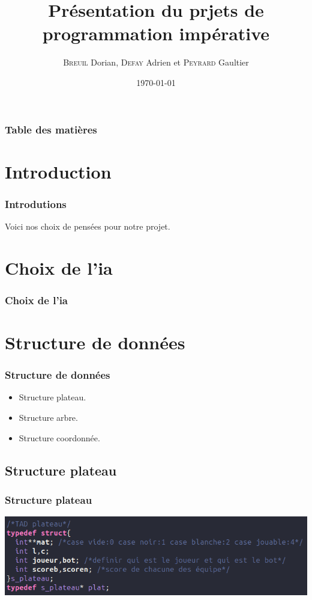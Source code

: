 \documentclass[9pt]{beamer}
\title{Présentation du prjets de programmation impérative}
\author{\textsc{Breuil} Dorian, \textsc{Defay} Adrien et \textsc{Peyrard} Gaultier}
\date{\today}
\begin{document}
\frame{\titlepage}  %

\begin{frame}
  \frametitle{Table des matières}
  \tableofcontents
  
\end{frame}

\section{Introduction}
\begin{frame}
  \frametitle{Introdutions}  %
  Voici nos choix de pensées pour notre projet.
\end{frame}

\section{Choix de l'ia}
\begin{frame}
  \frametitle{Choix de l'ia}  %
  
\end{frame}

\section{Structure de données}
\begin{frame}
  \frametitle{Structure de données}
  \begin{itemize}
  \item Structure plateau.
  \item Structure arbre.
  \item Structure coordonnée.
  \end{itemize}
\end{frame}

\subsection{Structure plateau}
\begin{frame}
  \frametitle{Structure plateau}
  \includegraphics[scale=0.4]{fich/struct_plateau.png}
\end{frame}
\end{document}
